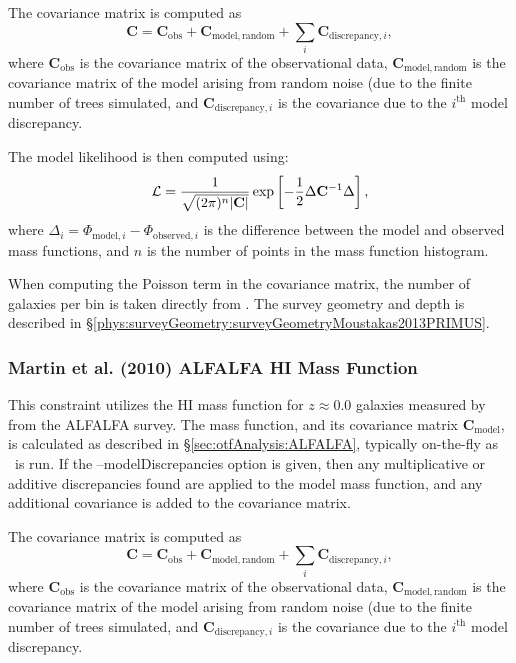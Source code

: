 The covariance matrix is computed as
\begin{equation}
 \mathbf{C} = \mathbf{C}_\mathrm{obs} + \mathbf{C}_\mathrm{model,random} + \sum_i \mathbf{C}_{\mathrm{discrepancy}, i},
\end{equation}
where $\mathbf{C}_\mathrm{obs}$ is the covariance matrix of the observational data, $\mathbf{C}_\mathrm{model,random}$ is the covariance matrix of the model arising from random noise (due to the finite number of trees simulated, and $\mathbf{C}_{\mathrm{discrepancy}, i}$ is the covariance due to the $i^\mathrm{th}$ model discrepancy.

The model likelihood is then computed using:
\begin{equation}
 \mathcal{L} = {1 \over \sqrt{(2 \pi)^n |\mathbf{C}|}} \exp\left[ -{1\over 2} \Delta \mathbf{C}^{-1} \Delta \right],
\end{equation}
where $\Delta_i = \Phi_{\mathrm{model}, i} - \Phi_{\mathrm{observed}, i}$ is the difference between the model and observed mass functions, and $n$ is the number of points in the mass function histogram.

When computing the Poisson term in the covariance matrix, the number of galaxies per bin is taken directly from \cite{moustakas_primus:_2013}. The survey geometry and depth is described in \S\ref{phys:surveyGeometry:surveyGeometryMoustakas2013PRIMUS}.

\subsubsection{Martin et al. (2010) ALFALFA HI Mass Function}\label{sec:AnalysisALFALFAHIMassFunction}

This constraint utilizes the HI mass function for $z\approx 0.0$ galaxies measured by \cite{martin_arecibo_2010} from the ALFALFA survey. The mass function, and its covariance matrix $\mathbf{C}_\mathrm{model}$, is calculated as described in \S\ref{sec:otfAnalysis:ALFALFA}, typically on-the-fly as \glc\ is run. If the {\normalfont \ttfamily --modelDiscrepancies} option is given, then any multiplicative or additive discrepancies found are applied to the model mass function, and any additional covariance is added to the covariance matrix.

The covariance matrix is computed as
\begin{equation}
 \mathbf{C} = \mathbf{C}_\mathrm{obs} + \mathbf{C}_\mathrm{model,random} + \sum_i \mathbf{C}_{\mathrm{discrepancy}, i},
\end{equation}
where $\mathbf{C}_\mathrm{obs}$ is the covariance matrix of the observational data, $\mathbf{C}_\mathrm{model,random}$ is the covariance matrix of the model arising from random noise (due to the finite number of trees simulated, and $\mathbf{C}_{\mathrm{discrepancy}, i}$ is the covariance due to the $i^\mathrm{th}$ model discrepancy.

